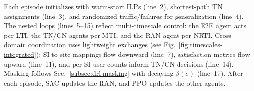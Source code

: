 \documentclass[12pt,lettersize,journal,onecolumn]{IEEEtran}
\begin{document}
Each episode initializes with warm-start ILPs (line~2), shortest-path TN assignments (line~3), and randomized traffic/failures for generalization (line~4). The nested loops (lines~5--15) reflect multi-timescale control: the E2E agent acts per LTI, the TN/CN agents per MTI, and the RAN agent per NRTI. Cross-domain coordination uses lightweight exchanges (see Fig.~\ref{fig:timescales-integrated}): SI-to-site mappings flow downward (line~7), satisfaction metrics flow upward (line~11), and per-SI user counts inform TN/CN decisions (line~14). Masking follows Sec.~\ref{subsec:drl-masking} with decaying $\beta(e)$ (line~17). After each episode, SAC updates the RAN, and PPO updates the other agents.



\end{document}
